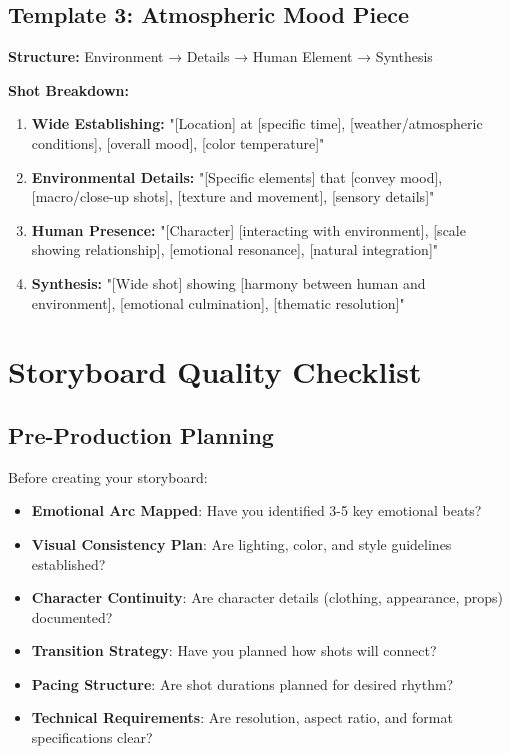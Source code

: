 \subsection*{Template 3: Atmospheric Mood Piece}
\textbf{Structure:} Environment → Details → Human Element → Synthesis

\textbf{Shot Breakdown:}
\begin{enumerate}
\item \textbf{Wide Establishing:} "[Location] at [specific time], [weather/atmospheric conditions], [overall mood], [color temperature]"
\item \textbf{Environmental Details:} "[Specific elements] that [convey mood], [macro/close-up shots], [texture and movement], [sensory details]"
\item \textbf{Human Presence:} "[Character] [interacting with environment], [scale showing relationship], [emotional resonance], [natural integration]"
\item \textbf{Synthesis:} "[Wide shot] showing [harmony between human and environment], [emotional culmination], [thematic resolution]"
\end{enumerate}

\section*{Storyboard Quality Checklist}

\subsection*{Pre-Production Planning}
Before creating your storyboard:

\begin{itemize}
\item[$\square$] \textbf{Emotional Arc Mapped}: Have you identified 3-5 key emotional beats?
\item[$\square$] \textbf{Visual Consistency Plan}: Are lighting, color, and style guidelines established?
\item[$\square$] \textbf{Character Continuity}: Are character details (clothing, appearance, props) documented?
\item[$\square$] \textbf{Transition Strategy}: Have you planned how shots will connect?
\item[$\square$] \textbf{Pacing Structure}: Are shot durations planned for desired rhythm?
\item[$\square$] \textbf{Technical Requirements}: Are resolution, aspect ratio, and format specifications clear?
\end{itemize}

